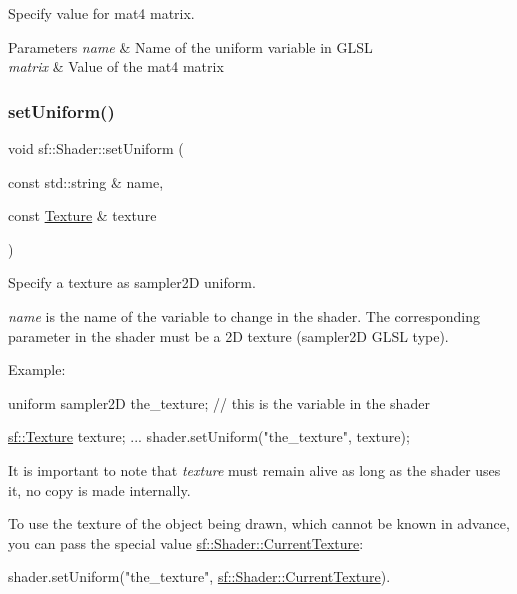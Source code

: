 Specify value for {\ttfamily mat4} matrix. 


\begin{DoxyParams}{Parameters}
{\em name} & Name of the uniform variable in G\+L\+SL \\
\hline
{\em matrix} & Value of the mat4 matrix \\
\hline
\end{DoxyParams}
\mbox{\label{classsf_1_1_shader_a7806a29ffbd0ee9251256a9e7265d479}} 
\subsubsection{\texorpdfstring{set\+Uniform()}{setUniform()}\hspace{0.1cm}{\footnotesize\ttfamily [15/16]}}
{\footnotesize\ttfamily void sf\+::\+Shader\+::set\+Uniform (\begin{DoxyParamCaption}\item[{const std\+::string \&}]{name,  }\item[{const \hyperlink{classsf_1_1_texture}{Texture} \&}]{texture }\end{DoxyParamCaption})}



Specify a texture as {\ttfamily sampler2D} uniform. 

{\itshape name} is the name of the variable to change in the shader. The corresponding parameter in the shader must be a 2D texture ({\ttfamily sampler2D} G\+L\+SL type).

Example\+: 
\begin{DoxyCode}
uniform sampler2D the\_texture; \textcolor{comment}{// this is the variable in the shader}
\end{DoxyCode}
 
\begin{DoxyCode}
\hyperlink{classsf_1_1_texture}{sf::Texture} texture;
...
shader.setUniform(\textcolor{stringliteral}{"the\_texture"}, texture);
\end{DoxyCode}
 It is important to note that {\itshape texture} must remain alive as long as the shader uses it, no copy is made internally.

To use the texture of the object being drawn, which cannot be known in advance, you can pass the special value \hyperlink{classsf_1_1_shader_ac84c7953eec2e19358ea6e2cc5385b8d}{sf\+::\+Shader\+::\+Current\+Texture}\+: 
\begin{DoxyCode}
shader.setUniform(\textcolor{stringliteral}{"the\_texture"}, \hyperlink{classsf_1_1_shader_ac84c7953eec2e19358ea6e2cc5385b8d}{sf::Shader::CurrentTexture}).
\end{DoxyCode}



